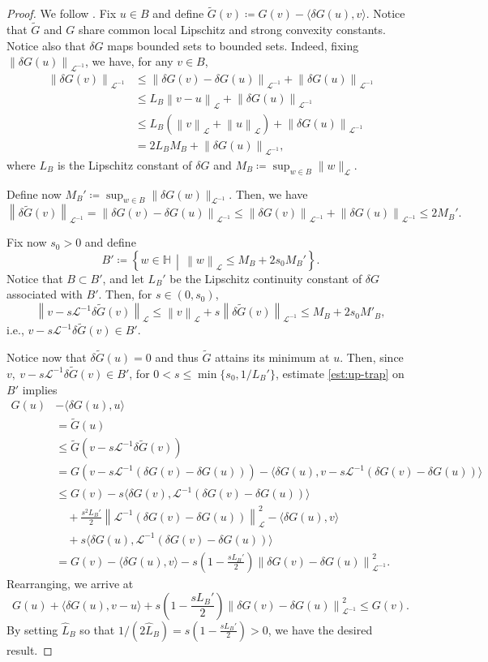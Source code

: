 \documentclass{amsart}
\newcommand{\normL}[1]{{\| #1 \|_{\mathcal{L}}}}
\newcommand{\normLinv}[1]{{\| #1 \|_{\mathcal{L}^{-1}}}}
\newcommand{\dG}{{\delta G}}
\newcommand{\dGtil}{{\delta \tilde{G}}}
\newcommand{\LL}{\mathcal{L}}
\newcommand{\LLinv}{{\mathcal{L}^{-1}}}
\newcommand{\norm}[2]{\left\| #1 \right\| _{#2}}
\newcommand{\pairing}[2]{\bigl\langle #1 , #2 \bigr\rangle}
\newcommand{\HH}{\mathbb{H}}
\theoremstyle{definition}
\begin{document}
\begin{proof}
	We follow \cite[p. 67, Thm.~2.1.5 (2.1.12)]{nesterov2018lectures}.
	Fix $u\in B$ and define $\tilde{G}(v) \coloneqq G(v)-\pairing{\dG(u)}{v}$.
	Notice that $\tilde{G}$ and $G$ share common local Lipschitz and strong convexity constants. 
	Notice also that $\dG$ maps bounded sets to bounded sets. Indeed, fixing $\norm{\dG(u)}{\LLinv}$, we have, for any $v\in B$, 
	\begin{align*}
\norm{\dG(v)}{\LLinv} & \le \norm{\dG(v) - \dG(u)}{\LLinv} + \norm{\dG(u)}{\LLinv} 
	\\
& \le L_B \norm{v-u}{\LL} +\norm{\dG(u)}{\LLinv} 
	\\
&\le L_B  (\norm{v}{\LL}+\norm{u}{\LL}) +\norm{\dG(u)}{\LLinv} 
	\\
& = 2L_B  M_B + \norm{\dG(u)}{\LLinv},
	\end{align*}
where $L_B$ is the Lipschitz constant of $\dG$ and $M_B \coloneqq \sup_{w\in B}{\normL{w}}$.

Define now $M_B' \coloneqq \sup_{w\in B}{\normLinv{\dG(w)}}$. Then, we have
	\begin{equation}\label{misc07}
			\norm{\dGtil(v)}{\LLinv} =\norm{\dG(v)-\dG(u)}{\LLinv}
			\le \norm{\dG(v)}{\LLinv} + \norm{\dG(u)}{\LLinv}\le 2M_B'.
	\end{equation}
	
	Fix now $s_0>0$ and define
	\[ 
	  B' \coloneqq \left\{w\in\HH \, \middle| \, \norm{w}{\LL}\le M_B+2 s_0 M_B' \right\}.
	\]
  Notice that $B \subset B'$, and let $ L_B'$ be the Lipschitz continuity constant of $\dG$ associated with $B'$. Then, for $s \in (0, s_0)$,
	\[
		\norm{v-s\LLinv\dGtil(v)}{\LL}\le \norm{v}{\LL} +s\norm{\dGtil(v)}{\LLinv}  \le M_B + 2 s_0 M'_B,
	\]
	i.e., $v-s\LLinv\dGtil(v) \in B'$.
	
	Notice now that $\dGtil(u)=0$ and thus $\tilde{G}$ attains its minimum at $u$. Then, since $v,\ v-s\LLinv\dGtil(v)\in B'$, for $0<s\le \min\{s_0, 1/ L_B'\}$, estimate \eqref{est:up-trap} on $B'$ implies
	\begin{align*}
G(u) &-\pairing{\dG(u)}{u} 
	\\
&= \tilde{G}(u)
	\\
& \le \tilde{G}(v-s\LLinv\dGtil(v)) 
	\\
&= G(v-s\LLinv(\dG(v)-\dG(u))) - \pairing{\dG(u)}{v-s\LLinv(\dG(v)-\dG(u))}
	\\
&\le G(v)  -s\pairing{\dG(v)}{\LLinv(\dG(v)-\dG(u))} 
	\\
& \quad +\frac{s^2 L_B'}{2} \norm{\LLinv(\dG(v)-\dG(u))}{\LL}^2 -\pairing{\dG(u)}{v} 
	\\
& \quad +s\pairing{\dG(u)}{\LLinv(\dG(v)-\dG(u))}
		\\
&= G(v) -\pairing{\dG(u)}{v} -s \left( 1-  \frac{s L_B'}{2} \right) \norm{\dG(v)-\dG(u)}{\LLinv}^2.
	\end{align*}
	Rearranging, we arrive at
	\begin{equation*}
		G(u) +\pairing{\dG(u)}{v-u} +s \left( 1-  \frac{s L_B'}{2} \right) \norm{\dG(v)-\dG(u)}{\LLinv}^2 \le G(v).
	\end{equation*}
	By setting $\hat L_B$ so that $1/(2\hat L_B) = s(1-  \frac{s L_B'}{2})>0$, we have the desired result. 


\end{proof}
\end{document}
